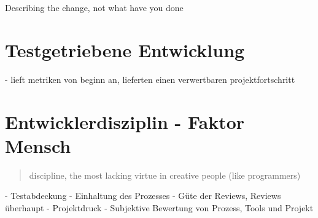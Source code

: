 Describing the change, not what have you done
\section{Testgetriebene Entwicklung}
- lieft metriken von beginn an, lieferten einen verwertbaren projektfortschritt


\section{Entwicklerdisziplin - Faktor Mensch}
\label{sec:human-fail}
\blockquote {discipline, the most lacking virtue in creative people (like programmers)}
- Testabdeckung
- Einhaltung des Prozesses
- Güte der Reviews, Reviews überhaupt
- Projektdruck
- Subjektive Bewertung von Prozess, Tools und Projekt

